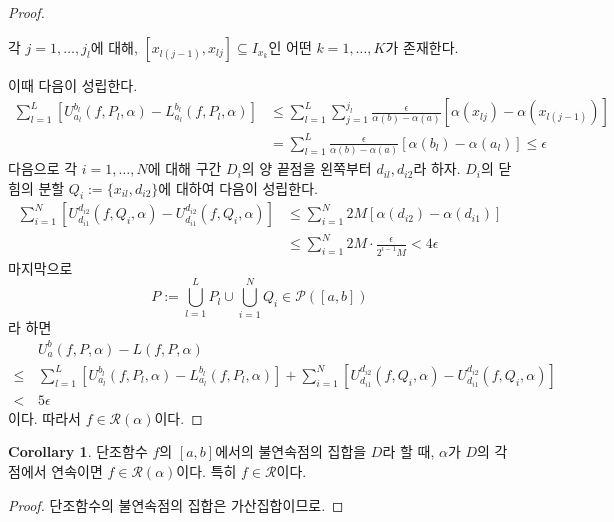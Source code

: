 \documentclass[11pt]{book}
\numberwithin{equation}{chapter}
\def\eps{\epsilon}
\def\calP{\mathcal{P}}
\def\calR{\mathcal{R}}
\theoremstyle{definition}
\newtheorem{cor}[thm]{Corollary}
\begin{document}
\begin{proof}
    \begin{center}
        각 \(j = 1, \ldots, j_l\)에 대해, \([x_{l(j-1)}, x_{lj}] \subseteq I_{x_k}\)인 어떤 \(k =1 , \ldots, K\)가 존재한다.
    \end{center}
    이때 다음이 성립한다.
    \begin{align*}
        \sum_{l=1}^L [U_{a_l}^{b_l} (f, P_l, \alpha) - L_{a_l}^{b_l}(f, P_l, \alpha)] &\le \sum_{l=1}^L \sum_{j=1}^{j_l} \frac{\eps}{\alpha(b) - \alpha(a)} [\alpha(x_{lj}) - \alpha(x_{l(j-1)})]\\
        &= \sum_{l=1}^L \frac{\eps}{\alpha(b) - \alpha(a)} [\alpha(b_l) - \alpha(a_l)] \le \eps
    \end{align*}
    다음으로 각 \(i = 1, \ldots, N\)에 대해 구간 \(D_i\)의 양 끝점을 왼쪽부터 \(d_{il}, d_{i2}\)라 하자. \(D_i\)의 닫힘의 분할 \(Q_i := \{x_{il}, d_{i2}\}\)에 대하여 다음이 성립한다.
    \begin{align*}
        \sum_{i=1}^N [U_{d_{i1}}^{d_{i2}}(f, Q_i, \alpha) - U_{d_{i1}}^{d_{i2}}(f, Q_i, \alpha)] &\le \sum_{i=1}^N 2M[\alpha(d_{i2}) - \alpha(d_{i1})]\\
        &\le \sum_{i=1}^N 2M \cdot \frac{\eps}{2^{i-1}M} < 4\eps
    \end{align*}
    마지막으로
    \[
        P := \bigcup_{l=1}^L P_l \cup \bigcup_{i=1}^N Q_i \in \calP([a, b])
    \]
    라 하면
    \begin{align*}
        &U_a^b(f, P, \alpha) - L(f, P, \alpha)\\
        \le\,& \sum_{l=1}^L [U_{a_l}^{b_l} (f, P_l, \alpha) - L_{a_l}^{b_l}(f, P_l, \alpha)] + \sum_{i=1}^N [U_{d_{i1}}^{d_{i2}}(f, Q_i, \alpha) - U_{d_{i1}}^{d_{i2}}(f, Q_i, \alpha)]\\
        <\,&5\eps
    \end{align*}
    이다. 따라서 \(f \in \calR(\alpha)\)이다.
\end{proof}

\begin{cor}
    단조함수 \(f\)의 \([a, b]\)에서의 불연속점의 집합을 \(D\)라 할 때, \(\alpha\)가 \(D\)의 각 점에서 연속이면 \(f \in \calR(\alpha)\)이다. 특히 \(f \in \calR\)이다.
\end{cor}
\begin{proof}
    단조함수의 불연속점의 집합은 가산집합이므로.
\end{proof}
\end{document}
